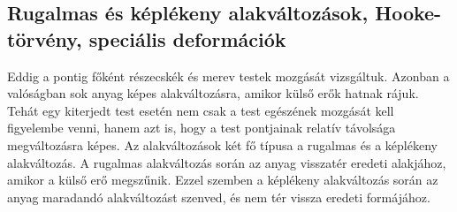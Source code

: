\documentclass[../main.tex]{subfiles}
\begin{document}
\subsection{Rugalmas és képlékeny alakváltozások, Hooke-törvény, speciális deformációk}
Eddig a pontig főként részecskék és merev testek mozgását vizsgáltuk. Azonban a valóságban sok anyag képes alakváltozásra,
amikor külső erők hatnak rájuk. Tehát egy kiterjedt test esetén nem csak a test egészének mozgását kell figyelembe venni,
hanem azt is, hogy a test pontjainak relatív távolsága megváltozásra képes. Az alakváltozások két fő típusa a rugalmas és a képlékeny alakváltozás.
A rugalmas alakváltozás során az anyag visszatér eredeti alakjához, amikor a külső erő megszűnik.
Ezzel szemben a képlékeny alakváltozás során az anyag maradandó alakváltozást szenved, és nem tér vissza eredeti formájához.
\end{document}
